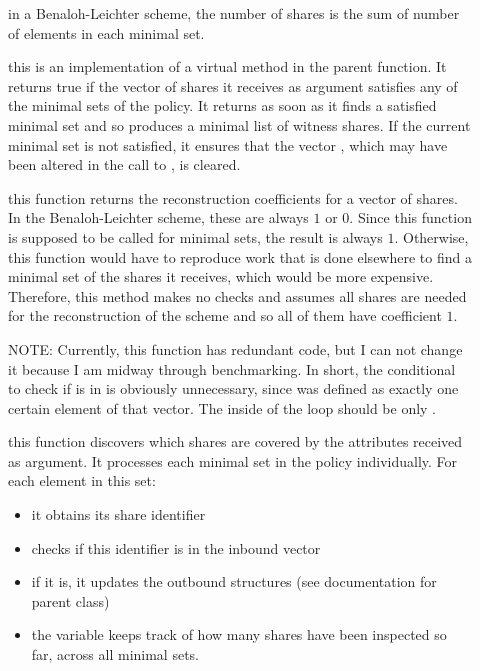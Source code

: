 \documentclass{article}
\begin{document}
\begin{description}
\item[] in a Benaloh-Leichter scheme, the number of shares is the sum of number of elements in each minimal set. 
\item[] this is an implementation of a virtual method in the parent function. It returns true if the vector of shares it receives as argument satisfies any of the minimal sets of the policy. It returns as soon as it finds a satisfied minimal set and so produces a minimal list of witness shares.
If the current minimal set is not satisfied, it ensures that the vector , which may have been altered in the call to , is cleared.

\item[] this function returns the reconstruction coefficients for a vector of shares. In the Benaloh-Leichter scheme, these are always $1$ or $0$. Since this function is supposed to be called for minimal sets, the result is always $1$. Otherwise, this function would have to reproduce work that is done elsewhere to find a minimal set of the shares it receives, which would be more expensive. Therefore, this method makes no checks and assumes all shares are needed for the reconstruction of the scheme and so all of them have coefficient $1$.

NOTE: Currently, this function has redundant code, but I can not change it because I am midway through benchmarking. In short, the conditional to check if  is in  is obviously unnecessary, since  was defined as exactly one certain element of that vector. The inside of the  loop should be only .

\item[] this function discovers which shares are covered by the attributes received as argument. It processes each minimal set in the policy individually. For each element in this set:
\begin{itemize}
\item it obtains its share identifier
\item checks if this identifier is in the inbound vector
\item if it is, it updates the outbound structures (see documentation for parent class)
\item the variable  keeps track of how many shares have been inspected so far, across all minimal sets.
\end{itemize}
\end{description}
\end{document}
